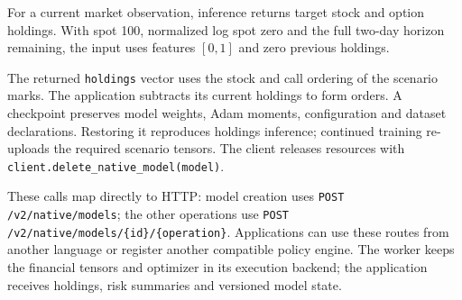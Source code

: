 \documentclass[8pt]{strategynet-journal}
\begin{document}
\begin{SNcolumns}
For a current market observation, inference returns target stock and option
holdings. With spot 100, normalized log spot zero and the full two-day
horizon remaining, the input uses features $[0,1]$ and zero previous holdings.



The returned \texttt{holdings} vector uses the stock and call ordering of the
scenario marks. The application subtracts its current holdings to form orders.
A checkpoint preserves model weights, Adam moments, configuration and dataset
declarations. Restoring it reproduces holdings inference; continued training
re-uploads the required scenario tensors. The client releases resources with
\texttt{client.delete\_native\_model(model)}.

These calls map directly to HTTP: model creation uses
\texttt{POST /v2/native/models}; the other operations use
\texttt{POST /v2/native/models/\{id\}/\{operation\}}. Applications can use
these routes from another language or register another compatible policy engine.
The worker keeps the financial tensors and optimizer in its execution backend;
the application receives holdings, risk summaries and versioned model state.

\end{SNcolumns}
\par\noindent
\end{document}

